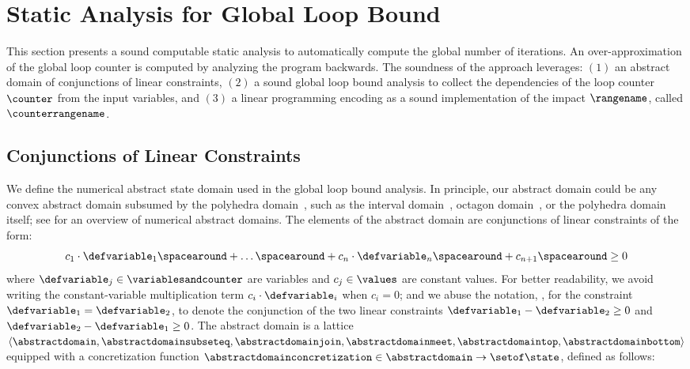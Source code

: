 \section{Static Analysis for Global Loop Bound}

This section presents a sound computable static analysis to automatically compute the global number of iterations.
An over-approximation of the global loop counter is computed by analyzing the program backwards.
The soundness of the approach leverages: $(1)$ an abstract domain of conjunctions of linear constraints, $(2)$ a sound global loop bound analysis to collect the dependencies of the loop counter $\counter$ from the input variables, and $(3)$ a linear programming encoding as a sound implementation of the impact $\rangename$, called $\counterrangename$.

\subsection{Conjunctions of Linear Constraints}

We define the numerical abstract state domain used in the global loop bound analysis.
In principle, our abstract domain could be any convex abstract domain subsumed by the polyhedra domain~, such as the interval domain~\cite{Cousot1978}, octagon domain~, or the polyhedra domain itself; see  for an overview of numerical abstract domains.
The elements of the abstract domain are conjunctions of linear constraints of the form:
%
\begin{equation*}
  c_1\cdot\defvariable_1 \spacearound+ \ldots \spacearound+ c_n\cdot\defvariable_n \spacearound+ c_{n+1} \spacearound\ge 0
\end{equation*}
%
where $\defvariable_j\in\variablesandcounter$ are variables and $c_j \in \values$ are constant values.
For better readability, we avoid writing the constant-variable multiplication term $c_i\cdot\defvariable_i$ when $c_i=0$; and we abuse the notation, \eg, for the constraint $\defvariable_1 = \defvariable_2$, to denote the conjunction of the two linear constraints $\defvariable_1 - \defvariable_2 \ge 0$ and $\defvariable_2 - \defvariable_1 \ge 0$.
The abstract domain is a lattice $\langle\abstractdomain, \abstractdomainsubseteq, \abstractdomainjoin, \abstractdomainmeet, \abstractdomaintop, \abstractdomainbottom\rangle$ equipped with a concretization function $\abstractdomainconcretization\in\abstractdomain\to\setof\state$, defined as follows:

